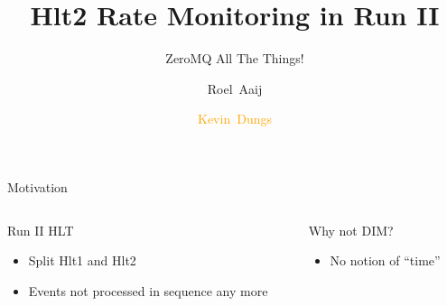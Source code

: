 \documentclass[aspectratio=1610,compress,titleprogressbar]{beamer}
\title{Hlt2 Rate Monitoring in Run II}
\subtitle{ZeroMQ All The Things!}
\author[K.~Dungs]{Roel~Aaij\inst{1} \and \textcolor{orange}{Kevin~Dungs\inst{2}}}
\institute{\inst{1} CERN \and \inst{2} TU Dortmund}
\begin{document}
\maketitle

\begin{frame}{Motivation}
  \begin{columns}[t]
    \begin{column}{.5\textwidth}
      \begin{block}{Run II HLT}
        \begin{itemize}
          \item Split Hlt1 and Hlt2
          \item Events not processed in sequence any more
        \end{itemize}
      \end{block}
    \end{column}
    \begin{column}{.5\textwidth}
      \begin{block}{Why not DIM?}
        \begin{itemize}
          \item No notion of ``time''
        \end{itemize}
      \end{block}
    \end{column}
  \end{columns}
\end{frame}
\end{document}

